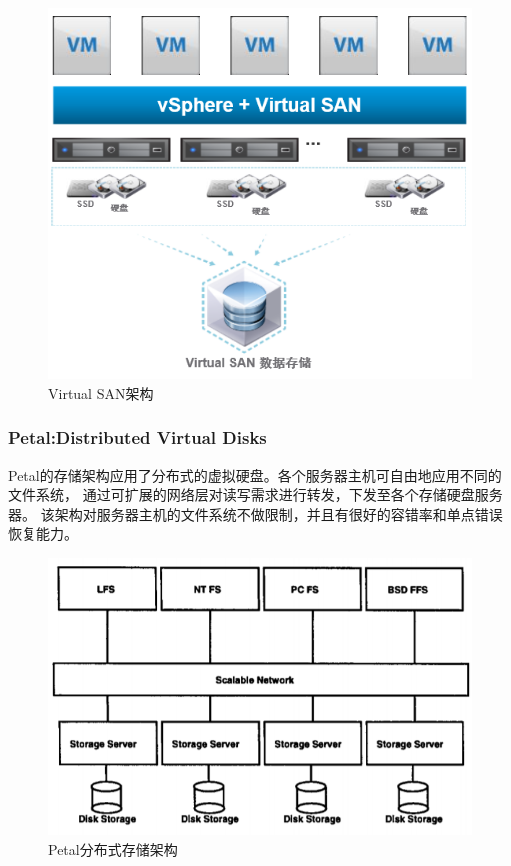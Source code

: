 \begin{figure}
\centering
\includegraphics[scale=0.8]{Figures/storage/virtualSAN_architecture.jpg}
\decoRule
\caption{Virtual SAN架构}
\label{fig:virtualSAN_architecture}
\end{figure}
\subsubsection{Petal:Distributed Virtual Disks\cite{lee1996petal}}
Petal的存储架构应用了分布式的虚拟硬盘。各个服务器主机可自由地应用不同的文件系统，
通过可扩展的网络层对读写需求进行转发，下发至各个存储硬盘服务器。
该架构对服务器主机的文件系统不做限制，并且有很好的容错率和单点错误恢复能力。
\begin{figure}
\centering
\includegraphics[scale=0.8]{Figures/storage/dvd_architecture.jpg}
\decoRule
\caption{Petal分布式存储架构}
\label{fig:dvd_architecture}
\end{figure}

